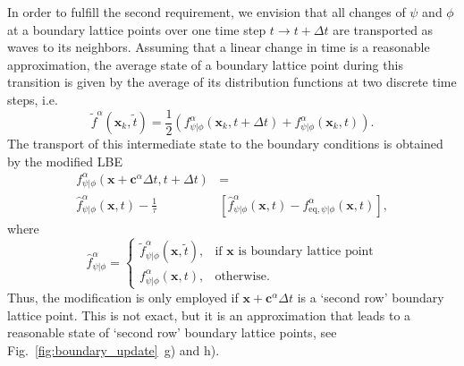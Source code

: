 \documentclass{article}
\renewcommand{\vec}{\boldsymbol}        %
\newcommand{\argum}{(\vec{x},t)}
\begin{document}
In order to fulfill the second requirement, we envision that all changes of $\psi$ and $\phi$ at a boundary lattice points over one time step $t\to{t+\Delta{t}}$ are transported as waves to its neighbors. Assuming that a linear change in time is a reasonable approximation, the average state of a boundary lattice point during this transition is given by the average of its distribution functions at two discrete time steps, i.e.
\begin{equation}
    \tilde{f}^\alpha(\vec{x}_k,\tilde{t}) = \dfrac{1}{2}\left(f_{\psi\vert\phi}^{\alpha}(\vec{x}_k,t+\Delta{t}) + f_{\psi\vert\phi}^{\alpha}(\vec{x}_k,t)\right).
\end{equation}
The transport of this intermediate state to the boundary conditions is obtained by the modified LBE 
\begin{align}
    f^{\alpha}_{\psi\vert\phi} \left( \vec{x} + \vec{c}^{\alpha} \Delta{t}, t + \Delta{t} \right) & = \nonumber\\
    \hat{f}^{\alpha}_{\psi\vert\phi} \argum - \frac{1}{\tau} &\left[ \hat{f}^{\alpha}_{\psi\vert\phi} \argum - f^{\alpha}_{\text{eq},\psi\vert\phi} \argum \right],
    \label{eq:LBE_mod}
\end{align}
where 
\[
    \hat{f}^{\alpha}_{\psi\vert\phi}= 
\begin{cases}
    \tilde{f}^{\alpha}_{\psi\vert\phi}(\vec{x},\tilde{t}),& \text{if } \vec{x} \text{ is boundary lattice point}\\
    {f}^{\alpha}_{\psi\vert\phi}(\vec{x},{t}),              & \text{otherwise.}
\end{cases}
\]
Thus, the modification is only employed if  $\vec{x} + \vec{c}^{\alpha} \Delta{t}$ is a `second row' boundary lattice point. This is not exact, but it is an approximation that leads to a reasonable state of `second row' boundary lattice points, see Fig.~\ref{fig:boundary_update}~g) and h). 


\end{document}
